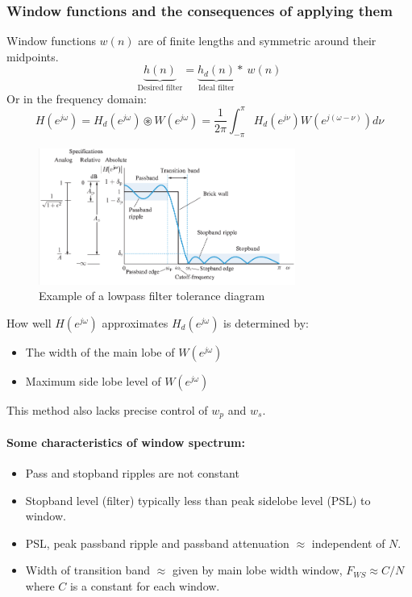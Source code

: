 \documentclass{article}
\begin{document}
\subsubsection{Window functions and the consequences of applying them}
Window functions $w(n)$ are of finite lengths and symmetric around their midpoints. 
\begin{equation}
    \underbrace{h(n)}_{\text{Desired filter}} = \underbrace{h_d (n)}_{\text{Ideal filter}} \ast \ w(n)
\end{equation}
Or in the frequency domain:
\begin{equation}
    H(e^{j\omega}) =  H_d (e^{j\omega}) \circledast W(e^{j\omega}) = \frac{1}{2\pi} \int_{-\pi}^{\pi} H_d (e^{j\nu}) W(e^{j(\omega - \nu)}) d\nu
\end{equation}
\begin{figure}[h!]
    \centering
    \includegraphics[width=0.75\textwidth]{figures/Filter design/lowpass_tolerance_diagram.png}
    \caption{Example of a lowpass filter tolerance diagram}
    \label{fig:tolerance_diagram}
\end{figure}

How well $H(e^{j\omega})$ approximates $H_d (e^{j\omega})$ is determined by:
\begin{itemize}
    \item The width of the main lobe of $W(e^{j\omega})$
    \item Maximum side lobe level of $W(e^{j\omega})$
\end{itemize}

This method also lacks precise control of $w_p$ and $w_s$.

\paragraph{Some characteristics of window spectrum:}
\begin{itemize}
    \item Pass and stopband ripples are not constant
    \item Stopband level (filter) typically less than peak sidelobe level (PSL) to window. 
    \item PSL, peak passband ripple and passband attenuation $\approx$ independent of $N$.
    \item Width of transition band $\approx$ given by main lobe width window, $F_{WS} \approx C/N$ where $C$ is a constant for each window.
\end{itemize}
\end{document}
